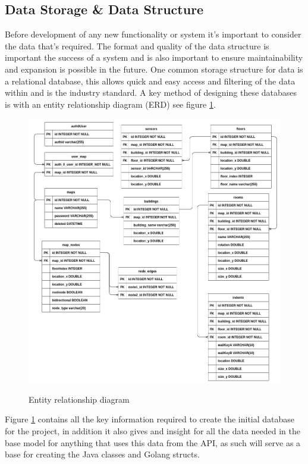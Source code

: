 \subsection{Data Storage \& Data Structure}
Before development of any new functionality or system it's important to consider the data that's required. The format and quality of the data structure is important the success of a system and is also important to ensure maintainability and expansion is possible in the future. One common storage structure for data is a relational database, this allows quick and easy access and filtering of the data within and is the industry standard. A key method of designing these databases is with an entity relationship diagram (ERD) see figure \ref{fig:erd}.

\begin{figure}[h]
	\centering
	\includegraphics[width=.9\linewidth]{./images/designs/erddetailed.png}\\
	\caption{Entity relationship diagram}
	\label{fig:erd}
\end{figure}

Figure \ref{fig:erd} contains all the key information required to create the initial database for the project, in addition it also gives and insight for all the data needed in the base model for anything that uses this data from the API, as such will serve as a base for creating the Java classes and Golang structs. 

